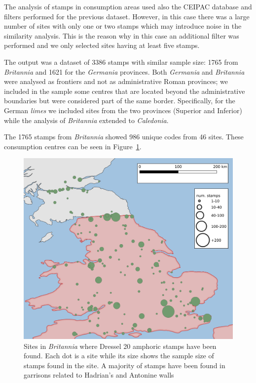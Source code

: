 The analysis of stamps in consumption areas used also the CEIPAC database and filters performed for the previous dataset. However, in this case there was a large number of sites with only one or two stamps which may introduce noise in the similarity analysis. This is the reason why in this case an additional filter was performed and we only selected sites having at least five stamps.

The output was a dataset of 3386 stamps with similar sample size: 1765 from \textit{Britannia} and 1621 for the \textit{Germania} provinces. Both \textit{Germania} and \textit{Britannia} were analysed as frontiers and not as administrative Roman provinces; we included in the sample some centres that are located beyond the administrative boundaries but were considered part of the same border. Specifically, for the German \textit{limes} we included sites from the two provinces (Superior and Inferior) while the analysis of \textit{Britannia} extended to \textit{Caledonia}.
 
The 1765 stamps from \textit{Britannia} showed 986 unique codes from 46 sites. These consumption centres can be seen in Figure~\ref{britannia}.
 
\begin{figure}[htp]
	\centering
\includegraphics[width=\linewidth]{britannia}
\caption{Sites in \textit{Britannia} where Dressel 20 amphoric stamps have been found. Each dot is a site while its size shows the sample size of stamps found in the site. A majority of stamps have been found in garrisons related to Hadrian's and Antonine walls}
\label{britannia}
\end{figure} 

